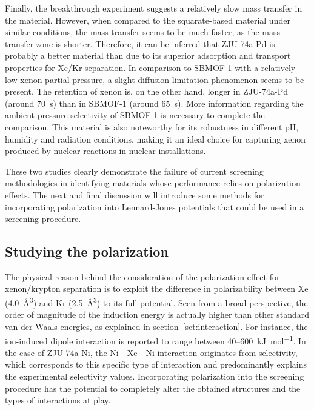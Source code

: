 \documentclass[main]{subfiles}
\begin{document}
Finally, the breakthrough experiment suggests a relatively slow mass transfer in the material. However, when compared to the squarate-based material under similar conditions, the mass transfer seems to be much faster, as the mass transfer zone is shorter. Therefore, it can be inferred that ZJU-74a-Pd is probably a better material than  due to its superior adsorption and transport properties for Xe/Kr separation. In comparison to SBMOF-1 with a relatively low xenon partial pressure, a slight diffusion limitation phenomenon seems to be present. The retention of xenon is, on the other hand, longer in ZJU-74a-Pd (around \SI{70}{\s}) than in SBMOF-1 (around \SI{65}{\s}). More information regarding the ambient-pressure selectivity of SBMOF-1 is necessary to complete the comparison.
This material is also noteworthy for its robustness in different pH, humidity and radiation conditions, making it an ideal choice for capturing xenon produced by nuclear reactions in nuclear installations.

These two studies clearly demonstrate the failure of current screening methodologies in identifying materials whose performance relies on polarization effects. The next and final discussion will introduce some methods for incorporating polarization into Lennard-Jones potentials that could be used in a screening procedure.

\subsection{Studying the polarization}

The physical reason behind the consideration of the polarization effect for xenon/krypton separation is to exploit the difference in polarizability between Xe (\SI{4.0}{\cubic\angstrom}) and Kr (\SI{2.5}{\cubic\angstrom})\autocite{Olney1997} to its full potential. Seen from a broad perspective, the order of magnitude of the induction energy is actually higher than other standard van der Waals energies, as explained in section~\ref{sct:interaction}. For instance, the ion-induced dipole interaction is reported to range between 40--600~\si{\kJ\per\mol}. In the case of ZJU-74a-Ni, the Ni---Xe---Ni interaction originates from selectivity, which corresponds to this specific type of interaction and predominantly explains the experimental selectivity values. Incorporating polarization into the screening procedure has the potential to completely alter the obtained structures and the types of interactions at play.
\end{document}
